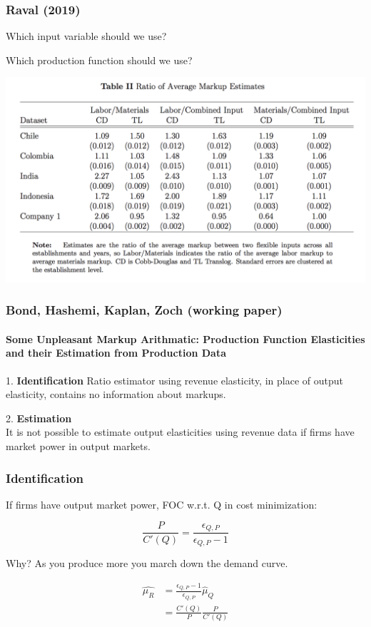 \documentclass[11pt, aspectratio=169]{beamer}
\newcommand{\Skip}{\vspace{1em}}
\newenvironment{wideitemize}{\itemize\addtolength{\itemsep}{10pt}}{\enditemize}
\begin{document}
\begin{frame}[c]\frametitle{Raval (2019)}
    
\begin{wideitemize}
	\item Which input variable should we use?
	\item Which production function should we use?
\end{wideitemize}

\centering
\includegraphics[scale=.45]{RavalT2.png}

\end{frame}




\begin{frame}[c]\frametitle{Bond, Hashemi, Kaplan, Zoch (working paper)}
\framesubtitle{Some Unpleasant Markup Arithmatic: Production Function Elasticities and their
Estimation from Production Data}    

\Skip
1. \textbf{Identification}
Ratio estimator using revenue elasticity, in place of output elasticity, contains
no information about markups.

\Skip\Skip\Skip
2. \textbf{Estimation}\\
It is not possible to estimate output elasticities using revenue data if firms have
market power in output markets.

\end{frame}


\begin{frame}[c]\frametitle{Identification}
    
If firms have output market power, FOC w.r.t. Q in cost minimization:

\[
	\frac{P}{C'(Q)} = \frac{\epsilon_{Q,P}}{\epsilon_{Q,P} - 1}
\]

\Skip\Skip
Why? As you produce more you march down the demand curve.

\begin{align*}
	\hat{\mu_R} &= \frac{\epsilon_{Q,P} - 1}{\epsilon_{Q,P}} \hat{\mu}_Q \\
	&= \frac{C'(Q)}{P} \frac{P}{C'(Q)}
\end{align*}


\end{frame}
\end{document}
